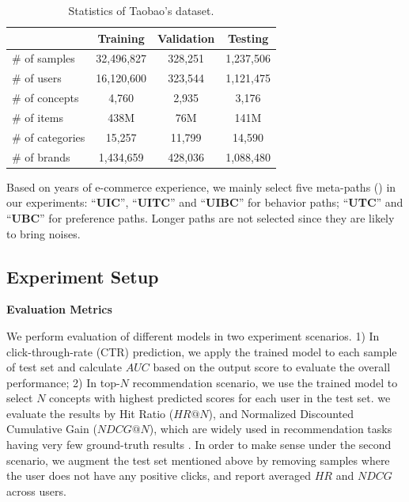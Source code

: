 \begin{table}[th]
	\centering
	\begin{tabular}{l|c|c|c}
		\hline
		  & Training & Validation & Testing \\
		\hline
		\# of samples & 32,496,827 & 328,251 & 1,237,506 \\
		\# of users & 16,120,600 & 323,544 & 1,121,475 \\
		\# of concepts & 4,760 & 2,935 & 3,176 \\
		\hline
		\# of items & 438M & 76M  & 141M \\
		\# of categories & 15,257 & 11,799 & 14,590 \\
		\# of brands & 1,434,659 & 428,036 & 1,088,480 \\
		\hline
	\end{tabular}
	\caption{Statistics of Taobao's dataset.}
	\label{tab:exp_data}
\end{table}

Based on years of e-commerce experience, we mainly select five meta-paths () in our experiments: ``\textbf{UIC}'', ``\textbf{UITC}'' and ``\textbf{UIBC}'' for behavior  paths; ``\textbf{UTC}'' and ``\textbf{UBC}'' for preference paths.
Longer paths are not selected since they are likely to bring noises.




\subsection{Experiment Setup}

\noindent
\textbf{Evaluation Metrics}

\noindent
We perform evaluation of different models in two experiment scenarios.
1) In click-through-rate (CTR) prediction, we apply the trained model to each sample of test set and calculate $AUC$ based on the output score to evaluate the overall performance; 2) In top-$N$ recommendation scenario, 
we use the trained model to select $N$ concepts with highest predicted scores for each user in the test set. 
we evaluate the results by Hit Ratio ($HR@N$), and Normalized  Discounted Cumulative Gain ($NDCG@N$),
which are widely used in recommendation tasks having very few ground-truth results \cite{huang2018improving,chen2018sequential}.
In order to make sense under the second scenario, 
we augment the test set mentioned above by removing samples where the user does not have any positive clicks,
and report averaged $HR$ and $NDCG$ across users.

